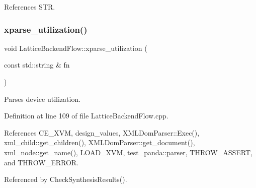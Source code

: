 References S\+TR.

\mbox{\label{classLatticeBackendFlow_af95e74925a7a7c8f6e770fa99f62481b}} 
\subsubsection{\texorpdfstring{xparse\+\_\+utilization()}{xparse\_utilization()}}
{\footnotesize\ttfamily void Lattice\+Backend\+Flow\+::xparse\+\_\+utilization (\begin{DoxyParamCaption}\item[{const std\+::string \&}]{fn }\end{DoxyParamCaption})\hspace{0.3cm}{\ttfamily [private]}}



Parses device utilization. 



Definition at line 109 of file Lattice\+Backend\+Flow.\+cpp.



References C\+E\+\_\+\+X\+VM, design\+\_\+values, X\+M\+L\+Dom\+Parser\+::\+Exec(), xml\+\_\+child\+::get\+\_\+children(), X\+M\+L\+Dom\+Parser\+::get\+\_\+document(), xml\+\_\+node\+::get\+\_\+name(), L\+O\+A\+D\+\_\+\+X\+VM, test\+\_\+panda\+::parser, T\+H\+R\+O\+W\+\_\+\+A\+S\+S\+E\+RT, and T\+H\+R\+O\+W\+\_\+\+E\+R\+R\+OR.



Referenced by Check\+Synthesis\+Results().

